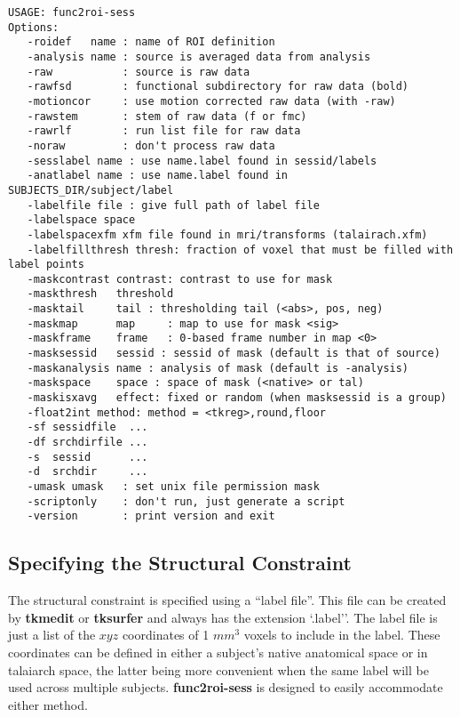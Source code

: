 \documentclass[10pt]{article}
\begin{document}
\begin{small}
\begin{verbatim}
USAGE: func2roi-sess
Options:
   -roidef   name : name of ROI definition
   -analysis name : source is averaged data from analysis
   -raw           : source is raw data 
   -rawfsd        : functional subdirectory for raw data (bold)
   -motioncor     : use motion corrected raw data (with -raw)
   -rawstem       : stem of raw data (f or fmc)
   -rawrlf        : run list file for raw data
   -noraw         : don't process raw data
   -sesslabel name : use name.label found in sessid/labels
   -anatlabel name : use name.label found in SUBJECTS_DIR/subject/label
   -labelfile file : give full path of label file
   -labelspace space 
   -labelspacexfm xfm file found in mri/transforms (talairach.xfm)
   -labelfillthresh thresh: fraction of voxel that must be filled with label points
   -maskcontrast contrast: contrast to use for mask
   -maskthresh   threshold 
   -masktail     tail : thresholding tail (<abs>, pos, neg) 
   -maskmap      map     : map to use for mask <sig>
   -maskframe    frame   : 0-based frame number in map <0>
   -masksessid   sessid : sessid of mask (default is that of source)
   -maskanalysis name : analysis of mask (default is -analysis)
   -maskspace    space : space of mask (<native> or tal)
   -maskisxavg   effect: fixed or random (when masksessid is a group)
   -float2int method: method = <tkreg>,round,floor
   -sf sessidfile  ...
   -df srchdirfile ...
   -s  sessid      ...
   -d  srchdir     ...
   -umask umask   : set unix file permission mask
   -scriptonly    : don't run, just generate a script
   -version       : print version and exit
\end{verbatim}
\end{small}

\subsection{Specifying the Structural Constraint}

The structural constraint is specified using a ``label file''. This
file can be created by {\bf tkmedit} or {\bf tksurfer} and always has
the extension `.label''.  The label file is just a list of the $xyz$
coordinates of 1 $mm^3$ voxels to include in the label. These
coordinates can be defined in either a subject's native anatomical
space or in talaiarch space, the latter being more convenient when the
same label will be used across multiple subjects. {\bf func2roi-sess}
is designed to easily accommodate either method. 
\end{document}
